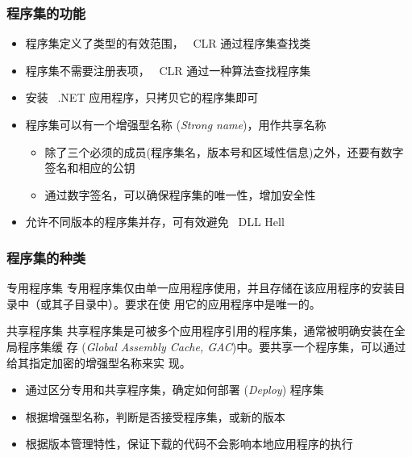 \begin{frame}
\frametitle{程序集的功能}
\begin{itemize}
  \setlength{\itemsep}{10pt plus 1pt}
\item 程序集定义了类型的有效范围， ~CLR 通过程序集查找类
\item 程序集不需要注册表项， ~CLR 通过一种算法查找程序集
\item 安装 ~.NET 应用程序，只拷贝它的程序集即可\pause
\item 程序集可以有一个{增强型名称} (\textit{Strong name})，用作共享名称
  \begin{itemize}
  \item 除了三个必须的成员(程序集名，版本号和区域性信息)之外，还要有数字签名和相应的公钥
  \item 通过数字签名，可以确保程序集的唯一性，增加安全性
  \end{itemize}

\item 允许不同版本的程序集并存，可有效避免 ~DLL Hell
\end{itemize}
\end{frame}

\begin{frame}
\frametitle{程序集的种类}

\begin{block}{专用程序集}
  \CJKindent \small 专用程序集仅由单一应用程序使用，并且存储在该应用程序的安装目录中（或其子目录中）。要求在使
  用它的应用程序中是唯一的。
\end{block}
\pause
\begin{block}{共享程序集}
  \CJKindent \small 共享程序集是可被多个应用程序引用的程序集，通常被明确安装在全局程序集缓
  存 (\textit{Global Assembly Cache, GAC})中。要共享一个程序集，可以通过给其指定加密的增强型名称来实
  现。
\end{block}
\pause
\begin{itemize}
\item 通过区分专用和共享程序集，确定如何{部署} (\textit{Deploy}) 程序集
\item 根据增强型名称，判断是否接受程序集，或新的版本
\item 根据版本管理特性，保证下载的代码不会影响本地应用程序的执行
\end{itemize}

\end{frame}

